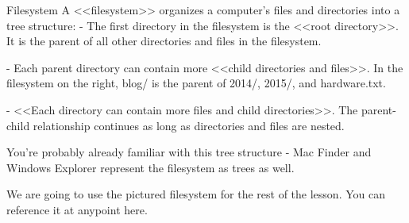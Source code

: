 Filesystem
    A <<filesystem>> organizes a computer’s files and directories into a tree structure:
        - The first directory in the filesystem is the <<root directory>>. It is the parent of all other directories and files in the filesystem.

        - Each parent directory can contain more <<child directories and files>>. In the filesystem on the right, blog/ is the parent of 2014/, 2015/, and hardware.txt.
    
        - <<Each directory can contain more files and child directories>>. The parent-child relationship continues as long as directories and files are nested.
    
    You’re probably already familiar with this tree structure - Mac Finder and Windows Explorer represent the filesystem as trees as well.

    We are going to use the pictured filesystem for the rest of the lesson. You can reference it at anypoint here.